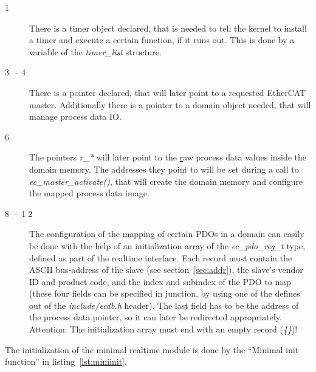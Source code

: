 \documentclass[a4paper,12pt,BCOR6mm,bibtotoc,idxtotoc]{scrbook}
\begin{document}
\begin{description}
\item[\normalfont\textcircled{\tiny 1}] There is a timer object
  declared, that is needed to tell the kernel to install a timer and
  execute a certain function, if it runs out. This is done by a
  variable of the \textit{timer\_list} structure.
\item[\normalfont\textcircled{\tiny 3} -- \textcircled{\tiny 4}] There
  is a pointer declared, that will later point to a requested EtherCAT
  master.  Additionally there is a pointer to a domain object needed,
  that will manage process data IO.
\item[\normalfont\textcircled{\tiny 6}] The pointers \textit{r\_*}
  will later point to the \underline{r}aw process data values inside
  the domain memory. The addresses they point to will be set during a
  call to \textit{ec\_\-master\_\-activate()}, that will create the
  domain memory and configure the mapped process data image.
\item[\normalfont\textcircled{\tiny 8} -- \textcircled{\tiny 12}] The
  configuration of the mapping of certain PDOs in a domain can easily
  be done with the help of an initialization array of the
  \textit{ec\_pdo\_reg\_t} type, defined as part of the realtime
  interface. Each record must contain the ASCII bus-address of the
  slave (see section~\ref{sec:addr}), the slave's vendor ID and
  product code, and the index and subindex of the PDO to map (these
  four fields can be specified in junction, by using one of the
  defines out of the \textit{include/ecdb.h} header). The last field
  has to be the address of the process data pointer, so it can later
  be redirected appropriately. Attention: The initialization array
  must end with an empty record (\textit{\{\}})!
\end{description}

The initialization of the minimal realtime module is done by the
``Minimal init function'' in listing~\ref{lst:miniinit}.
\end{document}
